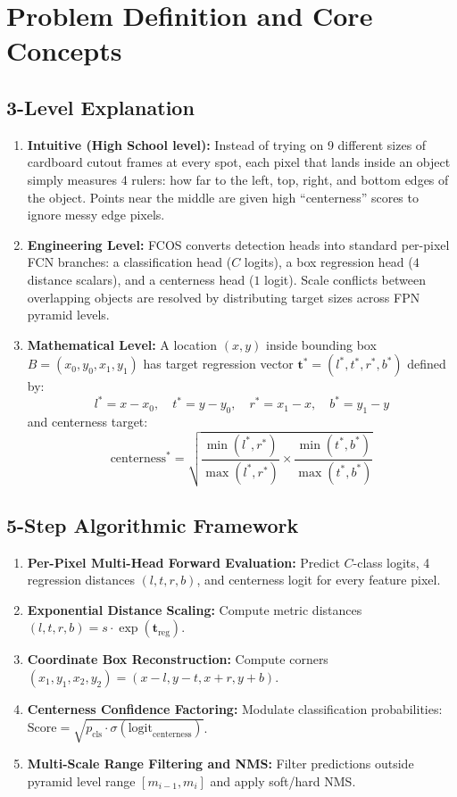 \documentclass[11pt,a4paper]{article}
\theoremstyle{definition}
\begin{document}
\section{Problem Definition and Core Concepts}

\subsection{3-Level Explanation}
\begin{enumerate}
    \item \textbf{Intuitive (High School level):} Instead of trying on 9 different sizes of cardboard cutout frames at every spot, each pixel that lands inside an object simply measures 4 rulers: how far to the left, top, right, and bottom edges of the object. Points near the middle are given high ``centerness'' scores to ignore messy edge pixels.
    \item \textbf{Engineering Level:} FCOS converts detection heads into standard per-pixel FCN branches: a classification head ($C$ logits), a box regression head ($4$ distance scalars), and a centerness head ($1$ logit). Scale conflicts between overlapping objects are resolved by distributing target sizes across FPN pyramid levels.
    \item \textbf{Mathematical Level:} A location $(x, y)$ inside bounding box $B = (x_0, y_0, x_1, y_1)$ has target regression vector $\mathbf{t}^* = (l^*, t^*, r^*, b^*)$ defined by:
    \begin{equation}
    l^* = x - x_0, \quad t^* = y - y_0, \quad r^* = x_1 - x, \quad b^* = y_1 - y
    \end{equation}
    and centerness target:
    \begin{equation}
    \text{centerness}^* = \sqrt{\frac{\min(l^*, r^*)}{\max(l^*, r^*)} \times \frac{\min(t^*, b^*)}{\max(t^*, b^*)}}
    \end{equation}
\end{enumerate}

\subsection{5-Step Algorithmic Framework}
\begin{enumerate}
    \item \textbf{Per-Pixel Multi-Head Forward Evaluation:} Predict $C$-class logits, 4 regression distances $(l, t, r, b)$, and centerness logit for every feature pixel.
    \item \textbf{Exponential Distance Scaling:} Compute metric distances $(l, t, r, b) = s \cdot \exp(\mathbf{t}_{\text{reg}})$.
    \item \textbf{Coordinate Box Reconstruction:} Compute corners $(x_1, y_1, x_2, y_2) = (x - l, y - t, x + r, y + b)$.
    \item \textbf{Centerness Confidence Factoring:} Modulate classification probabilities: $\text{Score} = \sqrt{p_{\text{cls}} \cdot \sigma(\text{logit}_{\text{centerness}})}$.
    \item \textbf{Multi-Scale Range Filtering and NMS:} Filter predictions outside pyramid level range $[m_{i-1}, m_i]$ and apply soft/hard NMS.
\end{enumerate}
\end{document}
